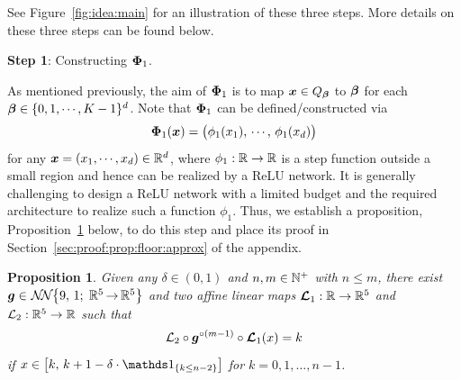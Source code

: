 \documentclass[nohyperref]{article}
\theoremstyle{plain}
\newtheorem{proposition}[theorem]{Proposition}
\theoremstyle{definition}
\theoremstyle{remark}
\begin{document}
See Figure~\ref{fig:idea:main} for an illustration of these three steps. More details on these three steps can be found below.

\vspace{4pt}
\textbf{Step 1}: Constructing ${\bm{\Phi}}_1$.

As mentioned previously, the aim of ${\bm{\Phi}}_1$ is to map ${\bm{x}}\in Q_{\bm{\beta}}$ to ${\bm{\beta}}$ for each $\bmbeta\in \{0,1,\dotsc,K-1\}^d$. Note that 
${\bm{\Phi}}_1$ can be defined/constructed via \[\bmPhi_1(\bmx)=\big(\phi_1(x_1),\,\dotsc,\,\phi_1(x_d)\big)\]
for any $\bmx=(x_1,\dotsc,x_d)\in\R^d$, where $\phi_1:\R\to\R$  is a  step function outside a small region and hence can be  realized by a ReLU network. 
It is generally challenging to design a ReLU network with a limited budget and the required architecture to realize such a  function  $\phi_1$. Thus, we establish a proposition, Proposition~\ref{prop:floor:approx} below, to do this step and place its proof in Section~\ref{sec:proof:prop:floor:approx} of the appendix.


\begin{proposition}
	\label{prop:floor:approx}
	Given any $\delta\in (0,1)$ and $n,m\in \N^+$ with $n\le m$,
	there exist $\bmg \in
	\nn[\big]{9}{1}{5}{5}$
	and two affine linear maps $\bmcalL_1:\R\to\R^5$ and $\calL_2:\R^5\to \R$ such that
	\begin{equation*}
		{\mathcal{L}}_2\circ{\bm{g}}^{\circ (m-1)}\circ {\bm{\mathcal{L}}}_1(x)=k
	\end{equation*}
if $x\in \big[k,\,k+1-\delta\cdot\one_{\{k\le n-2\}}\big]$ for $k=0,1,\dotsc,n-1$.
\end{proposition}
\end{document}
